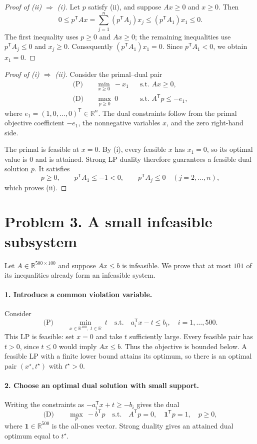 \documentclass[11pt]{article}
\newcommand{\R}{\mathbb{R}}
\newcommand{\T}{^{\mathsf T}}
\newcommand{\ones}{\mathbf{1}}
\begin{document}
\begin{proof}[Proof of (ii) $\Rightarrow$ (i)]
Let $p$ satisfy (ii), and suppose $Ax\ge0$ and $x\ge0$. Then
\[
0\le p\T Ax
=\sum_{j=1}^n(p\T A_j)x_j
\le(p\T A_1)x_1
\le0.
\]
The first inequality uses $p\ge0$ and $Ax\ge0$; the remaining inequalities use $p\T A_j\le0$ and $x_j\ge0$. Consequently $(p\T A_1)x_1=0$. Since $p\T A_1<0$, we obtain $x_1=0$.
\end{proof}

\begin{proof}[Proof of (i) $\Rightarrow$ (ii)]
Consider the primal--dual pair
\[
\begin{aligned}
\text{(P)}\quad &\min_{x\ge0}\ -x_1
&&\text{s.t. }Ax\ge0,\\[5pt]
\text{(D)}\quad &\max_{p\ge0}\ 0
&&\text{s.t. }A\T p\le-e_1,
\end{aligned}
\]
where $e_1=(1,0,\ldots,0)\T\in\R^n$. The dual constraints follow from the primal objective coefficient $-e_1$, the nonnegative variables $x$, and the zero right-hand side.

The primal is feasible at $x=0$. By (i), every feasible $x$ has $x_1=0$, so its optimal value is $0$ and is attained. Strong LP duality therefore guarantees a feasible dual solution $p$. It satisfies
\[
p\ge0,\qquad p\T A_1\le-1<0,\qquad
p\T A_j\le0\quad(j=2,\ldots,n),
\]
which proves (ii).
\end{proof}

\newpage
\section*{Problem 3. A small infeasible subsystem}
Let $A\in\R^{500\times100}$ and suppose $Ax\le b$ is infeasible. We prove that at most $101$ of its inequalities already form an infeasible system.

\paragraph{1. Introduce a common violation variable.}
Consider
\[
\text{(P)}\qquad
\min_{x\in\R^{100},\;t\in\R}\ t
\quad\text{s.t.}\quad a_i\T x-t\le b_i,
\quad i=1,\ldots,500.
\]
This LP is feasible: set $x=0$ and take $t$ sufficiently large. Every feasible pair has $t>0$, since $t\le0$ would imply $Ax\le b$. Thus the objective is bounded below. A feasible LP with a finite lower bound attains its optimum, so there is an optimal pair $(x^\star,t^\star)$ with $t^\star>0$.

\paragraph{2. Choose an optimal dual solution with small support.}
Writing the constraints as $-a_i\T x+t\ge-b_i$ gives the dual
\[
\text{(D)}\qquad
\max_p\ -b\T p
\quad\text{s.t.}\quad A\T p=0,\quad
\ones\T p=1,\quad p\ge0,
\]
where $\ones\in\R^{500}$ is the all-ones vector. Strong duality gives an attained dual optimum equal to $t^\star$.
\end{document}
